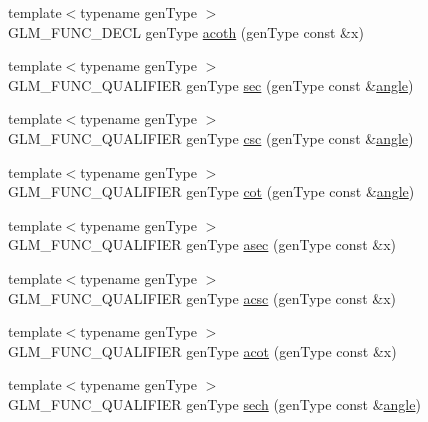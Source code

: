 \begin{DoxyCompactItemize}
{\footnotesize template$<$typename gen\-Type $>$ }\\G\-L\-M\-\_\-\-F\-U\-N\-C\-\_\-\-D\-E\-C\-L gen\-Type \hyperlink{group__gtc__reciprocal_gad73911994e6bb6a06cc3ea1bd89201ab}{acoth} (gen\-Type const \&x)
\item 
{\footnotesize template$<$typename gen\-Type $>$ }\\G\-L\-M\-\_\-\-F\-U\-N\-C\-\_\-\-Q\-U\-A\-L\-I\-F\-I\-E\-R gen\-Type \hyperlink{group__gtc__reciprocal_gabb6829a472da1cc94d88afa6396bed1f}{sec} (gen\-Type const \&\hyperlink{group__gtc__quaternion_ga23a3fc7ada5bbb665ff84c92c6e0542c}{angle})
\item 
{\footnotesize template$<$typename gen\-Type $>$ }\\G\-L\-M\-\_\-\-F\-U\-N\-C\-\_\-\-Q\-U\-A\-L\-I\-F\-I\-E\-R gen\-Type \hyperlink{group__gtc__reciprocal_ga5df75de99f63e854087a06f538907b2c}{csc} (gen\-Type const \&\hyperlink{group__gtc__quaternion_ga23a3fc7ada5bbb665ff84c92c6e0542c}{angle})
\item 
{\footnotesize template$<$typename gen\-Type $>$ }\\G\-L\-M\-\_\-\-F\-U\-N\-C\-\_\-\-Q\-U\-A\-L\-I\-F\-I\-E\-R gen\-Type \hyperlink{group__gtc__reciprocal_ga2f49e28c2634ae1a212e2fc38c42ad42}{cot} (gen\-Type const \&\hyperlink{group__gtc__quaternion_ga23a3fc7ada5bbb665ff84c92c6e0542c}{angle})
\item 
{\footnotesize template$<$typename gen\-Type $>$ }\\G\-L\-M\-\_\-\-F\-U\-N\-C\-\_\-\-Q\-U\-A\-L\-I\-F\-I\-E\-R gen\-Type \hyperlink{group__gtc__reciprocal_gac9761980e09149002a466ca131a4bcac}{asec} (gen\-Type const \&x)
\item 
{\footnotesize template$<$typename gen\-Type $>$ }\\G\-L\-M\-\_\-\-F\-U\-N\-C\-\_\-\-Q\-U\-A\-L\-I\-F\-I\-E\-R gen\-Type \hyperlink{group__gtc__reciprocal_ga135e8f6b36bb85b5f7d8067e6b890e4d}{acsc} (gen\-Type const \&x)
\item 
{\footnotesize template$<$typename gen\-Type $>$ }\\G\-L\-M\-\_\-\-F\-U\-N\-C\-\_\-\-Q\-U\-A\-L\-I\-F\-I\-E\-R gen\-Type \hyperlink{group__gtc__reciprocal_ga97d029f989f849b62915b068c264246b}{acot} (gen\-Type const \&x)
\item 
{\footnotesize template$<$typename gen\-Type $>$ }\\G\-L\-M\-\_\-\-F\-U\-N\-C\-\_\-\-Q\-U\-A\-L\-I\-F\-I\-E\-R gen\-Type \hyperlink{group__gtc__reciprocal_gaaa698b992c63f454a3a1a1baa2773a3c}{sech} (gen\-Type const \&\hyperlink{group__gtc__quaternion_ga23a3fc7ada5bbb665ff84c92c6e0542c}{angle})

\end{DoxyCompactItemize}
